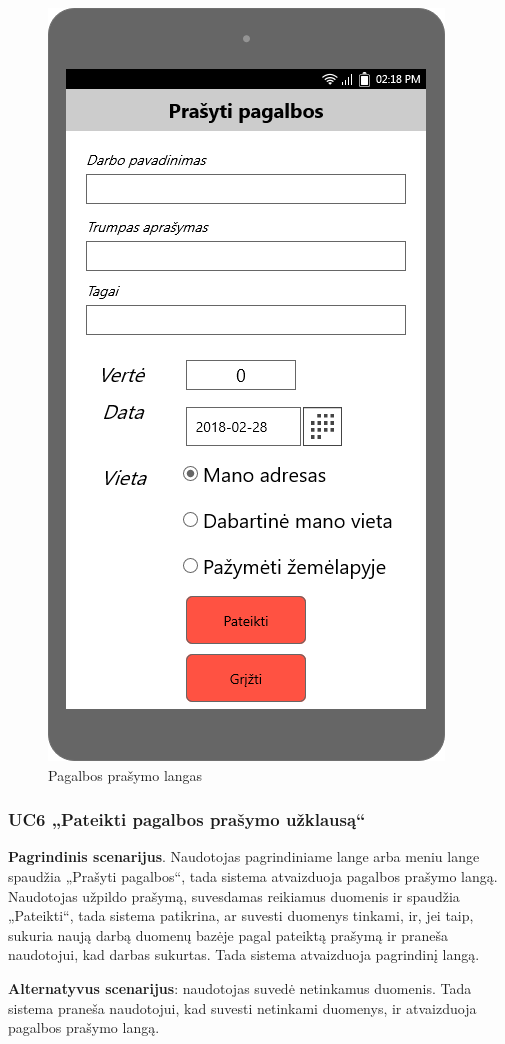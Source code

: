 \documentclass{VUMIFPSbakalaurinis}
\begin{document}
\begin{figure}[H]
	\centering
	\includegraphics[scale=0.4]{img/ScreenShots/Prašyti_pagalbos/00-Prašyti-pagalbos}
	\caption{Pagalbos prašymo langas}
	\label{img:help}
\end{figure}
\subsubsection{UC6 „Pateikti pagalbos prašymo užklausą“}
\textbf{Pagrindinis scenarijus}. Naudotojas pagrindiniame lange arba meniu lange spaudžia „Prašyti pagalbos“, tada sistema atvaizduoja pagalbos prašymo langą. Naudotojas užpildo prašymą, suvesdamas reikiamus duomenis ir spaudžia „Pateikti“, tada sistema patikrina, ar suvesti duomenys tinkami, ir, jei taip, sukuria naują darbą duomenų bazėje pagal pateiktą prašymą ir praneša naudotojui, kad darbas sukurtas. Tada sistema atvaizduoja pagrindinį langą.
\par \textbf{Alternatyvus scenarijus}: naudotojas suvedė netinkamus duomenis. Tada sistema praneša naudotojui, kad suvesti netinkami duomenys, ir atvaizduoja pagalbos prašymo langą.
\end{document}
